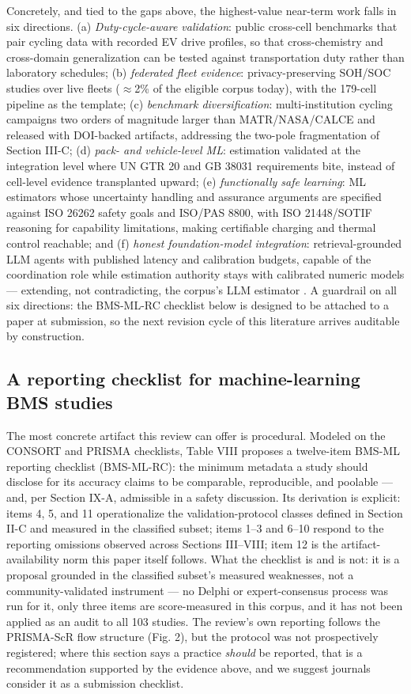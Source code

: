 \documentclass[journal]{IEEEtran}
\begin{document}
Concretely, and tied to the gaps above, the highest-value near-term work falls in six directions. (a) \textit{Duty-cycle-aware validation}: public cross-cell benchmarks that pair cycling data with recorded EV drive profiles, so that cross-chemistry and cross-domain generalization can be tested against transportation duty rather than laboratory schedules; (b) \textit{federated fleet evidence}: privacy-preserving SOH/SOC studies over live fleets ($\approx$2\% of the eligible corpus today), with the 179-cell pipeline as the template; (c) \textit{benchmark diversification}: multi-institution cycling campaigns two orders of magnitude larger than MATR/NASA/CALCE and released with DOI-backed artifacts, addressing the two-pole fragmentation of Section III-C; (d) \textit{pack- and vehicle-level ML}: estimation validated at the integration level where UN GTR 20 and GB 38031 requirements bite, instead of cell-level evidence transplanted upward; (e) \textit{functionally safe learning}: ML estimators whose uncertainty handling and assurance arguments are specified against ISO 26262 safety goals and ISO/PAS 8800, with ISO 21448/SOTIF reasoning for capability limitations, making certifiable charging and thermal control reachable; and (f) \textit{honest foundation-model integration}: retrieval-grounded LLM agents with published latency and calibration budgets, capable of the coordination role while estimation authority stays with calibrated numeric models --- extending, not contradicting, the corpus's LLM estimator \cite{r15}. A guardrail on all six directions: the BMS-ML-RC checklist below is designed to be attached to a paper at submission, so the next revision cycle of this literature arrives auditable by construction.

\subsection{A reporting checklist for machine-learning BMS studies}

The most concrete artifact this review can offer is procedural. Modeled on the CONSORT and PRISMA checklists, Table VIII proposes a twelve-item BMS-ML reporting checklist (BMS-ML-RC): the minimum metadata a study should disclose for its accuracy claims to be comparable, reproducible, and poolable --- and, per Section IX-A, admissible in a safety discussion. Its derivation is explicit: items 4, 5, and 11 operationalize the validation-protocol classes defined in Section II-C and measured in the classified subset; items 1--3 and 6--10 respond to the reporting omissions observed across Sections III--VIII; item 12 is the artifact-availability norm this paper itself follows. What the checklist is and is not: it is a proposal grounded in the classified subset's measured weaknesses, not a community-validated instrument --- no Delphi or expert-consensus process was run for it, only three items are score-measured in this corpus, and it has not been applied as an audit to all 103 studies. The review's own reporting follows the PRISMA-ScR flow structure (Fig. 2), but the protocol was not prospectively registered; where this section says a practice \textit{should} be reported, that is a recommendation supported by the evidence above, and we suggest journals consider it as a submission checklist.
\end{document}
